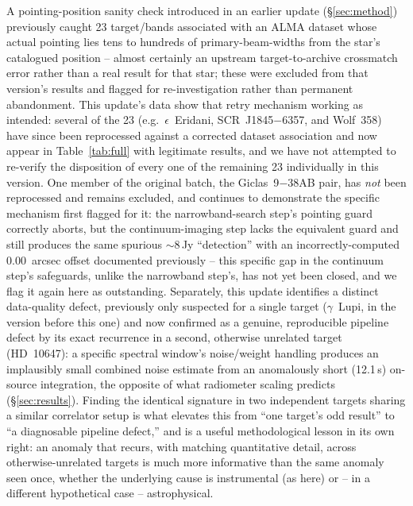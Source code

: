 \documentclass{openjournal}
\begin{document}
A pointing-position sanity check introduced in an earlier update
(\S\ref{sec:method}) previously caught 23 target/bands associated with
an ALMA dataset whose actual pointing lies tens to hundreds of
primary-beam-widths from the star's catalogued position -- almost
certainly an upstream target-to-archive crossmatch error rather than a
real result for that star; these were excluded from that version's
results and flagged for re-investigation rather than permanent
abandonment. This update's data show that retry mechanism working as
intended: several of the 23 (e.g.\ $\epsilon$~Eridani,
SCR~J1845$-$6357, and Wolf~358) have since been reprocessed against a
corrected dataset association and now appear in Table~\ref{tab:full}
with legitimate results, and we have not attempted to re-verify the
disposition of every one of the remaining 23 individually in this
version. One member of the original batch, the Giclas~9$-$38AB pair, has
\emph{not} been reprocessed and remains excluded, and continues to
demonstrate the specific mechanism first flagged for it: the
narrowband-search step's pointing guard correctly aborts, but the
continuum-imaging step lacks the equivalent guard and still produces the
same spurious $\sim$8\,Jy ``detection'' with an incorrectly-computed
0.00~arcsec offset documented previously -- this specific gap in the
continuum step's safeguards, unlike the narrowband step's, has not yet
been closed, and we flag it again here as outstanding.
Separately, this update identifies a distinct data-quality
defect, previously only suspected for a single target ($\gamma$~Lupi, in
the version before this one) and now confirmed as a genuine, reproducible
pipeline defect by its exact recurrence in a second, otherwise unrelated
target (HD~10647): a specific spectral window's noise/weight handling
produces an implausibly small combined noise estimate from an
anomalously short (12.1\,s) on-source integration, the opposite of what
radiometer scaling predicts (\S\ref{sec:results}). Finding the identical
signature in two independent targets sharing a similar correlator setup
is what elevates this from ``one target's odd result'' to ``a
diagnosable pipeline defect,'' and is a useful methodological lesson in
its own right: an anomaly that recurs, with matching quantitative
detail, across otherwise-unrelated targets is much more informative than
the same anomaly seen once, whether the underlying cause is instrumental
(as here) or -- in a different hypothetical case -- astrophysical.
\end{document}
